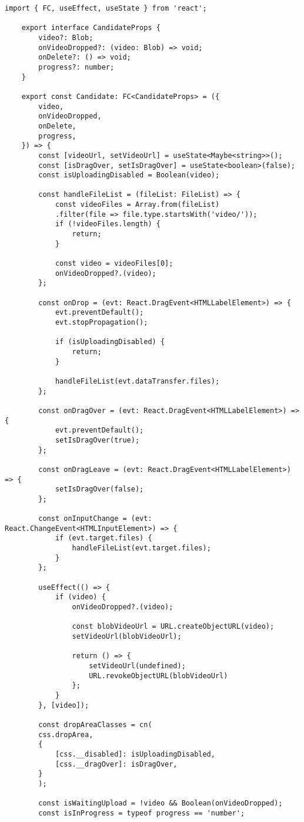 \begin{lstlisting}[caption={config/slice.ts}]
	import { FC, useEffect, useState } from 'react';
	
	export interface CandidateProps {
		video?: Blob;
		onVideoDropped?: (video: Blob) => void;
		onDelete?: () => void;
		progress?: number;
	}
	
	export const Candidate: FC<CandidateProps> = ({
		video,
		onVideoDropped,
		onDelete,
		progress,
	}) => {
		const [videoUrl, setVideoUrl] = useState<Maybe<string>>();
		const [isDragOver, setIsDragOver] = useState<boolean>(false);
		const isUploadingDisabled = Boolean(video);
		
		const handleFileList = (fileList: FileList) => {
			const videoFiles = Array.from(fileList)
			.filter(file => file.type.startsWith('video/'));
			if (!videoFiles.length) {
				return;
			}
			
			const video = videoFiles[0];
			onVideoDropped?.(video);
		};
		
		const onDrop = (evt: React.DragEvent<HTMLLabelElement>) => {
			evt.preventDefault();
			evt.stopPropagation();
			
			if (isUploadingDisabled) {
				return;
			}
			
			handleFileList(evt.dataTransfer.files);
		};
		
		const onDragOver = (evt: React.DragEvent<HTMLLabelElement>) => {
			evt.preventDefault();
			setIsDragOver(true);
		};
		
		const onDragLeave = (evt: React.DragEvent<HTMLLabelElement>) => {
			setIsDragOver(false);
		};
		
		const onInputChange = (evt: React.ChangeEvent<HTMLInputElement>) => {
			if (evt.target.files) {
				handleFileList(evt.target.files);
			}
		};
		
		useEffect(() => {
			if (video) {
				onVideoDropped?.(video);
				
				const blobVideoUrl = URL.createObjectURL(video);
				setVideoUrl(blobVideoUrl);
				
				return () => {
					setVideoUrl(undefined);
					URL.revokeObjectURL(blobVideoUrl)
				};
			}
		}, [video]);
		
		const dropAreaClasses = cn(
		css.dropArea,
		{
			[css.__disabled]: isUploadingDisabled,
			[css.__dragOver]: isDragOver,
		}
		);
		
		const isWaitingUpload = !video && Boolean(onVideoDropped);
		const isInProgress = typeof progress == 'number';
		

\end{lstlisting}
